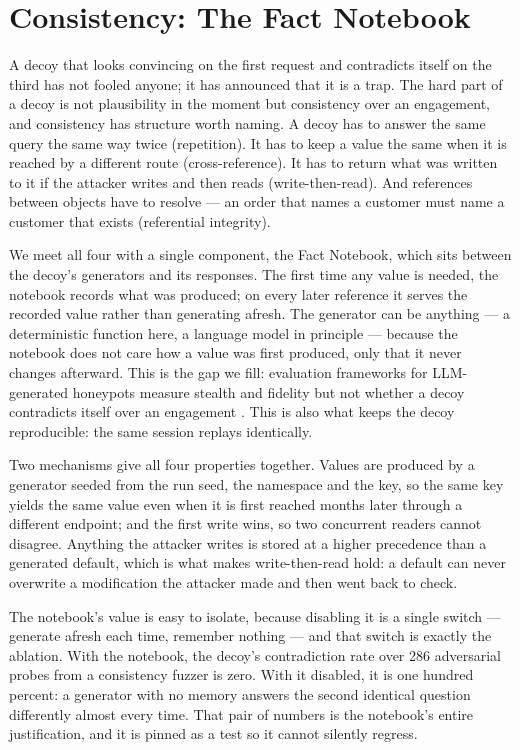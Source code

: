 
\section{Consistency: The Fact Notebook}

A decoy that looks convincing on the first request and contradicts itself on the
third has not fooled anyone; it has announced that it is a trap. The hard part of a
decoy is not plausibility in the moment but consistency over an engagement, and
consistency has structure worth naming. A decoy has to answer the same query the
same way twice (repetition). It has to keep a value the same when it is reached by
a different route (cross-reference). It has to return what was written to it if the
attacker writes and then reads (write-then-read). And references between objects
have to resolve --- an order that names a customer must name a customer that exists
(referential integrity).

We meet all four with a single component, the Fact Notebook, which sits between
the decoy's generators and its responses. The first time any value is needed, the
notebook records what was produced; on every later reference it serves the recorded
value rather than generating afresh. The generator can be anything --- a
deterministic function here, a language model in principle
\cite{sladic2024shellm,vero2026honeyval} --- because the notebook does not care how
a value was first produced, only that it never changes afterward. This is the gap
we fill: evaluation frameworks for LLM-generated honeypots measure stealth and
fidelity but not whether a decoy contradicts itself over an engagement
\cite{vero2026honeyval,bridges2025sok}. This is also what keeps the decoy
reproducible: the same session replays identically.

Two mechanisms give all four properties together. Values are produced by a
generator seeded from the run seed, the namespace and the key, so the same key
yields the same value even when it is first reached months later through a
different endpoint; and the first write wins, so two concurrent readers cannot
disagree. Anything the attacker writes is stored at a higher precedence than a
generated default, which is what makes write-then-read hold: a default can never
overwrite a modification the attacker made and then went back to check.

The notebook's value is easy to isolate, because disabling it is a single switch ---
generate afresh each time, remember nothing --- and that switch is exactly the
ablation. With the notebook, the decoy's contradiction rate over 286 adversarial
probes from a consistency fuzzer is zero. With it disabled, it is one hundred
percent: a generator with no memory answers the second identical question
differently almost every time. That pair of numbers is the notebook's entire
justification, and it is pinned as a test so it cannot silently regress.

